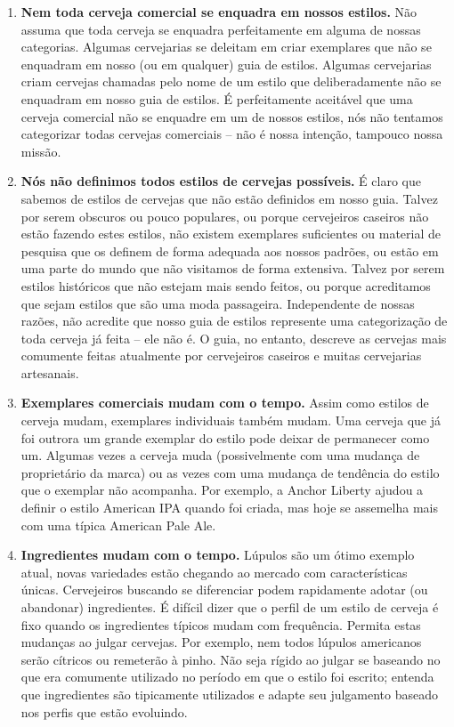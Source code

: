 \begin{enumerate}
\item \textbf{Nem toda cerveja comercial se enquadra em nossos estilos.} Não assuma que toda cerveja se enquadra perfeitamente em alguma de nossas categorias. Algumas cervejarias se deleitam em criar exemplares que não se enquadram em nosso (ou em qualquer) guia de estilos. Algumas cervejarias criam cervejas chamadas pelo nome de um estilo que deliberadamente não se enquadram em nosso guia de estilos. É perfeitamente aceitável que uma cerveja comercial não se enquadre em um de nossos estilos, nós não tentamos categorizar todas cervejas comerciais – não é nossa intenção, tampouco nossa missão.
\item \textbf{Nós não definimos todos estilos de cervejas possíveis.} É claro que sabemos de estilos de cervejas que não estão definidos em nosso guia. Talvez por serem obscuros ou pouco populares, ou porque cervejeiros caseiros não estão fazendo estes estilos, não existem exemplares suficientes ou material de pesquisa que os definem de forma adequada aos nossos padrões, ou estão em uma parte do mundo que não visitamos de forma extensiva. Talvez por serem estilos históricos que não estejam mais sendo feitos, ou porque acreditamos que sejam estilos que são uma moda passageira. Independente de nossas razões, não acredite que nosso guia de estilos represente uma categorização de toda cerveja já feita – ele não é. O guia, no entanto, descreve as cervejas mais comumente feitas atualmente por cervejeiros caseiros e muitas cervejarias artesanais.
\item \textbf{Exemplares comerciais mudam com o tempo.} Assim como estilos de cerveja mudam, exemplares individuais também mudam. Uma cerveja que já foi outrora um grande exemplar do estilo pode deixar de permanecer como um. Algumas vezes a cerveja muda (possivelmente com uma mudança de proprietário da marca) ou as vezes com uma mudança de tendência do estilo que o exemplar não acompanha. Por exemplo, a Anchor Liberty ajudou a definir o estilo American IPA quando foi criada, mas hoje se assemelha mais com uma típica American Pale Ale.
\item \textbf{Ingredientes mudam com o tempo.} Lúpulos são um ótimo exemplo atual, novas variedades estão chegando ao mercado com características únicas. Cervejeiros buscando se diferenciar podem rapidamente adotar (ou abandonar) ingredientes. É difícil dizer que o perfil de um estilo de cerveja é fixo quando os ingredientes típicos mudam com frequência. Permita estas mudanças ao julgar cervejas. Por exemplo, nem todos lúpulos americanos serão cítricos ou remeterão à pinho. Não seja rígido ao julgar se baseando no que era comumente utilizado no período em que o estilo foi escrito; entenda que ingredientes são tipicamente utilizados e adapte seu julgamento baseado nos perfis que estão evoluindo.

\end{enumerate}
